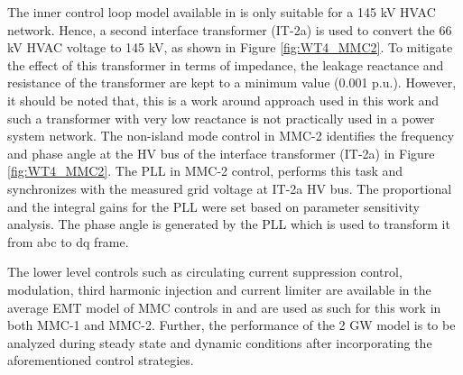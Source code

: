 The inner control loop model available in \cite{vrana2013cigre} is only suitable for a 145 kV \gls{HVAC} network. Hence, a second interface transformer (IT-2a) is used to convert the 66 kV \gls{HVAC} voltage to 145 kV, as shown in Figure \ref{fig:WT4_MMC2}. To mitigate the effect of this transformer in terms of impedance, the leakage reactance and resistance of the transformer are kept to a minimum value (0.001 p.u.). However, it should be noted that, this is a work around approach used in this work and such a transformer with very low reactance is not practically used in a power system network. The non-island mode control in \gls{MMC}-2 identifies the frequency and phase angle at the \gls{HV} bus of the interface transformer (IT-2a) in Figure \ref{fig:WT4_MMC2}. The \gls{PLL} in \gls{MMC}-2 control, performs this task and synchronizes with the measured grid voltage at IT-2a \gls{HV} bus. The proportional and the integral gains for the \gls{PLL} were set based on parameter sensitivity analysis. The phase angle is generated by the \gls{PLL} which is used to transform it from abc to dq frame.

The lower level controls such as circulating current suppression control, modulation, third harmonic injection and current limiter are available in the average \gls{EMT} model of \gls{MMC} controls in \cite{vrana2013cigre} and are used as such for this work in both \gls{MMC}-1 and \gls{MMC}-2. Further, the performance of the 2 GW model is to be analyzed during steady state and dynamic conditions after incorporating the aforementioned control strategies.

